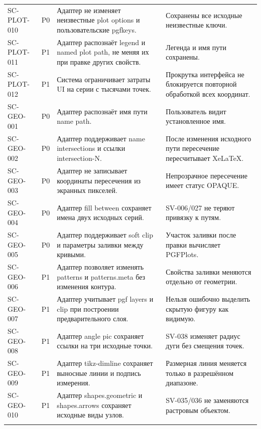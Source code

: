 \documentclass[11pt,a4paper,oneside]{scrreprt}
\begin{document}
\begin{longtable}{@{}>{\raggedright\arraybackslash}p{2.35cm}>{\raggedright\arraybackslash}p{0.75cm}>{\raggedright\arraybackslash}p{6.35cm}>{\raggedright\arraybackslash}p{5.2cm}@{}}
\footnotesize SC-PLOT-010 & P0 & Адаптер не изменяет неизвестные plot options и пользовательские pgfkeys. & Сохранены все исходные неизвестные ключи. \\ \addlinespace[2pt]
\footnotesize SC-PLOT-011 & P1 & Адаптер распознаёт legend и named plot path, не меняя их при правке других свойств. & Легенда и имя пути сохранены. \\ \addlinespace[2pt]
\footnotesize SC-PLOT-012 & P1 & Система ограничивает затраты UI на серии с тысячами точек. & Прокрутка интерфейса не блокируется повторной обработкой всех координат. \\ \addlinespace[2pt]
\footnotesize SC-GEO-001 & P0 & Адаптер распознаёт имя пути name path. & Пользователь видит установленное имя. \\ \addlinespace[2pt]
\footnotesize SC-GEO-002 & P0 & Адаптер поддерживает name intersections и ссылки intersection-N. & После изменения исходного пути пересечение пересчитывает XeLaTeX. \\ \addlinespace[2pt]
\footnotesize SC-GEO-003 & P0 & Адаптер не записывает координаты пересечения из экранных пикселей. & Непрозрачное пересечение имеет статус OPAQUE. \\ \addlinespace[2pt]
\footnotesize SC-GEO-004 & P0 & Адаптер fill between сохраняет имена двух исходных серий. & SV-006/027 не теряют привязку к путям. \\ \addlinespace[2pt]
\footnotesize SC-GEO-005 & P0 & Адаптер поддерживает soft clip и параметры заливки между кривыми. & Участок заливки после правки вычисляет PGFPlots. \\ \addlinespace[2pt]
\footnotesize SC-GEO-006 & P1 & Адаптер позволяет изменять patterns и patterns.meta без изменения контура. & Свойства заливки меняются отдельно от геометрии. \\ \addlinespace[2pt]
\footnotesize SC-GEO-007 & P1 & Адаптер учитывает pgf layers и clip при построении предварительного слоя. & Нельзя ошибочно выделить скрытую фигуру как видимую. \\ \addlinespace[2pt]
\footnotesize SC-GEO-008 & P1 & Адаптер angle pic сохраняет ссылки на три исходные точки. & SV-038 изменяет радиус дуги без смещения точек. \\ \addlinespace[2pt]
\footnotesize SC-GEO-009 & P1 & Адаптер tikz-dimline сохраняет выносные линии и подпись измерения. & Размерная линия меняется только в разрешённом диапазоне. \\ \addlinespace[2pt]
\footnotesize SC-GEO-010 & P1 & Адаптер shapes.geometric и shapes.arrows сохраняет исходные виды узлов. & SV-035/036 не заменяются растровым объектом. \\ \addlinespace[2pt]

\end{longtable}
\end{document}
